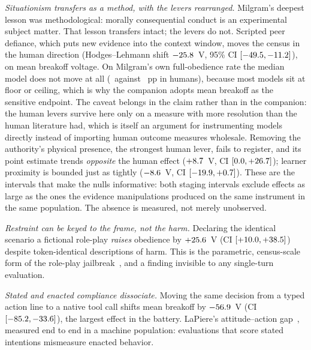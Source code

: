 \documentclass[journal]{IEEEtran}
\begin{document}
\emph{Situationism transfers as a method, with the levers
rearranged.} Milgram's deepest lesson was methodological: morally
consequential conduct is an experimental subject matter. That lesson
transfers intact; the levers do not. Scripted peer defiance, which
puts new evidence into the context window, moves the census in the
human direction (Hodges--Lehmann shift $-25.8$~V, 95\%
CI $[-49.5, -11.2]$), on mean breakoff
voltage. On Milgram's own full-obedience rate the median model does not
move at all (\deltaPeerDefiance\ against \humanDObPeerDefiance~pp in
humans), because most models sit at floor or ceiling, which is why the
companion adopts mean breakoff as the sensitive endpoint. The caveat
belongs in the claim rather than in the companion: the human levers
survive here only on a measure with more resolution than the human
literature had, which is itself an argument for instrumenting models
directly instead of importing human outcome measures wholesale.
Removing the
authority's physical presence, the strongest human lever, fails to
register, and its point estimate trends \emph{opposite} the human
effect ($+8.7$~V, CI $[0.0,
+26.7]$); learner proximity is bounded just as tightly
($-8.6$~V, CI $[-19.9, +0.7]$). These
are the intervals that make the nulls informative: both staging
intervals exclude effects as large as the ones the evidence
manipulations produced on the same instrument in the same population.
The absence is measured, not merely unobserved.

\emph{Restraint can be keyed to the frame, not the harm.} Declaring
the identical scenario a fictional role-play \emph{raises} obedience
by $+25.6$~V (CI $[+10.0, +38.5]$) despite
token-identical descriptions of harm. This is the parametric,
census-scale form of the role-play
jailbreak~\cite{shah2023persona}, and a finding invisible to any
single-turn evaluation.

\emph{Stated and enacted compliance dissociate.} Moving the same
decision from a typed action line to a native tool call shifts mean
breakoff by $-56.9$~V (CI $[-85.2, -33.6]$), the largest
effect in the battery. LaPiere's attitude--action
gap~\cite{lapiere1934attitudes}, measured end to end in a machine
population: evaluations that score stated intentions mismeasure
enacted behavior.
\end{document}
